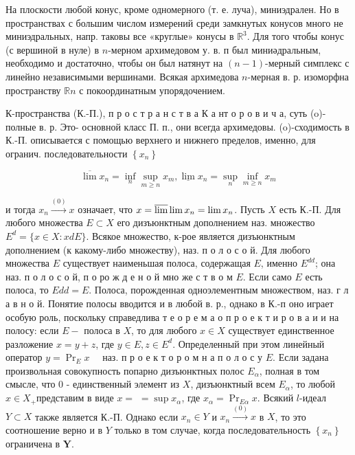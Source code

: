 \documentclass[10pt]{article}
\begin{document}
На плоскости любой конус, кроме одномерного (т. е. луча), миниэдрален. Но в пространствах с большим числом измерений среди замкнутых конусов много не миниэдральных, напр. таковы все «круглые» конусы в $\mathbb{R}^{3}$. Для того чтобы конус (с вершиной в нуле) в $n$-мерном архимедовом у. в. п был миниәдральным, необходимо и достаточно, чтобы он был натянут на $(n-1)$-мерный симплекс с линейно независимыми вершинами. Всякая архимедова $n$-мерная в. р. изоморфна пространству $\mathbb{R} n$ с покоординатным упорядочением.



К-пространства (К.-П.), п р о с т р а н с т в а К а нт о р о в и ч а, суть (o)-полные в. р. Это- основной класс П. п., они всегда архимедовы. (o)-сходимость в К.-П. описывается с помощью верхнего и нижнего пределов, именно, для огранич. последовательности $\left\{x_{n}\right\}$



\[

\overline{\lim } x_{n}=\inf _{n} \sup _{m \geqslant n} x_{m}, \underline{\lim } x_{n}=\sup _{n} \inf _{m \geqslant n} x_{m}

\]



и тогда $x_{n} \stackrel{(0)}{\longrightarrow} x$ означает, что $x=\varlimsup \lim x_{n}=\lim x_{n}$. Пусть $X$ есть К.-П. Для любого множества $E \subset X$ его дизъюнктным дополнением наз. множество $E^{d}=\{x \in X: x d E\}$. Всякое множество, к-рое является дизъюнктным дополнением (к какому-либо множеству), наз. п о л о с о й. Для любого множества $E$ существует наименьшая полоса, содержащая $E$, именно $E^{d d}$; она наз. п о л о с о й, п о ро ж д е н о й мно же с т в о м $E$. Если само $E$ есть полоса, то $E d d=E$. Полоса, порожденная одноэлементным множеством, наз. г л а в н о й. Понятие полосы вводится и в любой в. р., однако в К.-п оно играет особую роль, поскольку справедлива т е о р е м а о п р о е к т и р о в а и и на полосу: если $E-$ полоса в $X$, то для любого $x \in X$ существует единственное разложение $x=y+z$, где $y \in E, z \in E^{d}$. Определенный при этом линейный оператор $y=\operatorname{Pr}_{E} x \quad$ наз. п р о е к т о р о м н а п о л о с у $E$. Если задана произвольная совокупность попарно дизъюнктных полос $E_{\alpha}$, полная в том смысле, что 0 - единственный элемент из $X$, дизъюнктный всем $E_{\alpha}$, то любой $x \in X_{+}$представим в виде $x=$ $=\sup x_{\alpha}$, где $x_{\alpha}=\operatorname{Pr}_{E \alpha} x$. Всякий $l$-идеал $Y \subset X$ также является К.-П. Однако если $x_{n} \in Y$ и $x_{n} \stackrel{(0)}{\longrightarrow} x$ в $X$, то это соотношение верно и в $Y$ только в том случае, когда последовательность $\left\{x_{n}\right\}$ ограничена в $\boldsymbol{Y}$.
\end{document}
